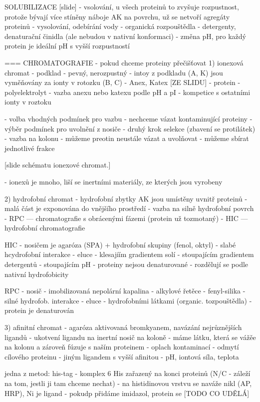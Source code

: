 \documentclass[DIV=8]{scrreprt}
\begin{document}
SOLUBILIZACE [slide]
- vsolování, u všech proteinů to zvyšuje rozpustnost, protože bývají více stíněny náboje AK na povrchu, už se netvoří agregáty proteinů
- vysolování, odebírání vody
- organická rozpouštědla
- detergenty, denaturační činidla (ale nebudou v nativní konformaci)
- změna pH, pro každý protein je ideální pH s vyšší rozpustností


=== CHROMATOGRAFIE
- pokud chceme proteiny přečišťovat
1) ionexová chromat
- podklad
    - pevný, nerozpustný
    - intoy z podkladu (A, K) jsou vyměňovány za ionty v rotozku (B, C)
    - Anex, Katex [ZE SLIDU]
- protein
    - polyelektrolyt
    - vazba anexu nebo katexu podle pH a pI
    - kompetice s ostatními ionty v roztoku

- volba vhodných podmínek pro vazbu
    - nechceme vázat kontaminující proteiny
- výběr podmínek pro uvolnění z nosiče
    - druhý krok selekce (zbavení se protilátek)
- vazba na kolonu
    - můžeme preotin neustále vázat a uvolňovat
    - můžeme sbírat jednotlivé frakce

[slide schématu ionexové chromat.]

- ionexů je mnoho, liší se inertními materiály, ze kterých jsou vyrobeny

2) hydrofobní chromat
- hydrofobní zbytky AK jsou umístěny uvnitř proteinů
- malá část je exponována do vnějšího prostředí
- vazba na silně hydrofobní povrch
    - RPC --- chromatografie s obrácenými fázemi (protein už tozmotaný)
    - HIC --- hydrofobní chromatografie

HIC
- nosičem je agaróza (SPA) + hydrofobní skupiny (fenol, oktyl)
- slabé hcydrofobní interakce
- eluce
    - klesajíím gradientem solí
    - stoupajícím gradientem detergentů
    - stoupajícím pH
- proteiny nejsou denaturované
- rozdělují se podle nativní hydrofobicity

RPC
- nosič
    - imobilizovaná nepolární kapalina
    - alkylové řetěce
    - fenyl-silika
- silné hydrofob. interakce
- eluce
    - hydrofobními látkami (organic. tozpouštědla)
- protein je denaturován

3) afinitní chromat
- agaróza aktivovaná bromkyanem, navázání nejrůznějších ligandů
- ukotvení ligandu na inertní nosič na koloně
    - máme látku, která se vážěe na kolonu a zároveň fúzuje s naším proteinem
- oplach kontaminací
- odmytí cílového proteinu
    - jiným ligandem s vyšší afinitou
    - pH, iontová síla, teplota

jedna z metod: his-tag
- komplex 6 His zařazený na konci proteinů (N/C - záleží na tom, jestli ji tam chceme nechat)
    - na histidinovou vrstvu se naváže nikl (AP, HRP), Ni je ligand
- pokudp přidáme imidazol, protein se [TODO CO UDĚLÁ]
\end{document}
